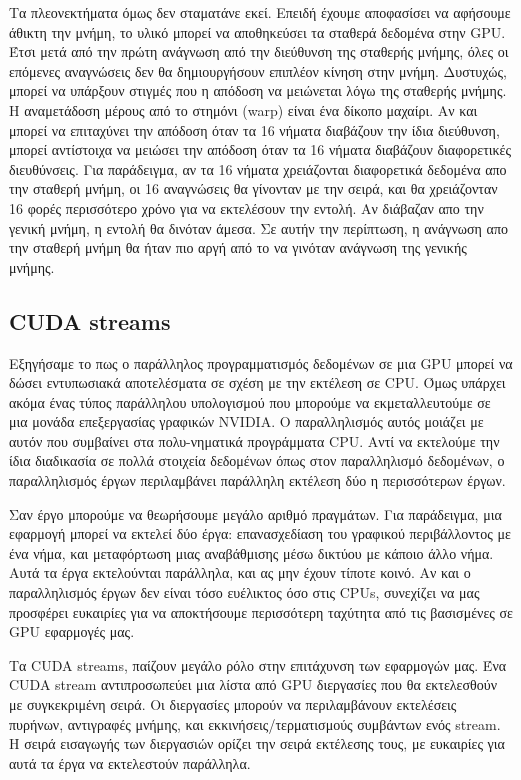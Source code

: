 Τα πλεονεκτήματα όμως δεν σταματάνε εκεί. Επειδή έχουμε αποφασίσει να αφήσουμε άθικτη την μνήμη, το υλικό μπορεί να αποθηκεύσει τα σταθερά δεδομένα στην GPU. Έτσι μετά από την πρώτη ανάγνωση από την διεύθυνση της σταθερής μνήμης, όλες οι επόμενες αναγνώσεις δεν θα δημιουργήσουν επιπλέον κίνηση στην μνήμη. Δυστυχώς, μπορεί να υπάρξουν στιγμές που η απόδοση να μειώνεται λόγω της σταθερής μνήμης. Η αναμετάδοση μέρους από το στημόνι (warp) είναι ένα δίκοπο μαχαίρι. Αν και μπορεί να επιταχύνει την απόδοση όταν τα 16 νήματα διαβάζουν την ίδια διεύθυνση, μπορεί αντίστοιχα να μειώσει την απόδοση όταν τα 16 νήματα διαβάζουν διαφορετικές διευθύνσεις. Για παράδειγμα, αν τα 16 νήματα χρειάζονται διαφορετικά δεδομένα απο την σταθερή μνήμη, οι 16 αναγνώσεις θα γίνονταν με την σειρά, και θα χρειάζονταν 16 φορές περισσότερο χρόνο για να εκτελέσουν την εντολή. Αν διάβαζαν απο την γενική μνήμη, η εντολή θα δινόταν άμεσα. Σε αυτήν την περίπτωση, η ανάγνωση απο την σταθερή μνήμη θα ήταν πιο αργή από το να γινόταν ανάγνωση της γενικής μνήμης.\cite{cuda-4}


\subsection{CUDA streams}
Εξηγήσαμε το πως ο παράλληλος προγραμματισμός δεδομένων σε μια GPU μπορεί να δώσει εντυπωσιακά αποτελέσματα σε σχέση με την εκτέλεση σε CPU. Όμως υπάρχει ακόμα ένας τύπος παράλληλου υπολογισμού που μπορούμε να εκμεταλλευτούμε σε μια μονάδα επεξεργασίας γραφικών NVIDIA. Ο παραλληλισμός αυτός μοιάζει με αυτόν που συμβαίνει στα πολυ-νηματικά προγράμματα CPU. Αντί να εκτελούμε την ίδια διαδικασία σε πολλά στοιχεία δεδομένων όπως στον παραλληλισμό δεδομένων, ο παραλληλισμός έργων περιλαμβάνει παράλληλη εκτέλεση δύο η περισσότερων έργων. 

Σαν έργο μπορούμε να θεωρήσουμε μεγάλο αριθμό πραγμάτων. Για παράδειγμα, μια εφαρμογή μπορεί να εκτελεί δύο έργα: επανασχεδίαση του γραφικού περιβάλλοντος με ένα νήμα, και μεταφόρτωση μιας αναβάθμισης μέσω δικτύου με κάποιο άλλο νήμα. Αυτά τα έργα εκτελούνται παράλληλα, και ας μην έχουν τίποτε κοινό. Αν και ο παραλληλισμός έργων δεν είναι τόσο ευέλικτος όσο στις CPUs, συνεχίζει να μας προσφέρει ευκαιρίες για να αποκτήσουμε περισσότερη ταχύτητα από τις βασισμένες σε GPU εφαρμογές μας.

Τα CUDA streams, παίζουν μεγάλο ρόλο στην επιτάχυνση των εφαρμογών μας. Ένα CUDA stream αντιπροσωπεύει μια λίστα από GPU διεργασίες που θα εκτελεσθούν με συγκεκριμένη σειρά. Οι διεργασίες μπορούν να περιλαμβάνουν εκτελέσεις πυρήνων, αντιγραφές μνήμης, και εκκινήσεις/τερματισμούς συμβάντων ενός stream. H σειρά εισαγωγής των διεργασιών ορίζει την σειρά εκτέλεσης τους, με ευκαιρίες για αυτά τα έργα να εκτελεστούν παράλληλα.

